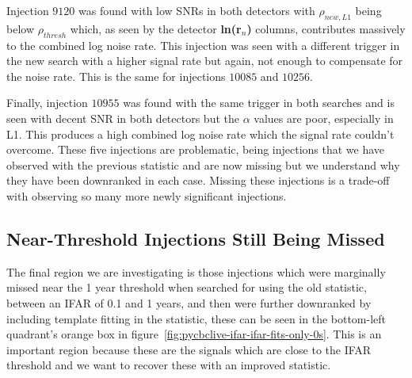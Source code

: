Injection $9120$ was found with low SNRs in both detectors with $\rho_{new, L1}$ being below $\rho_{thresh}$ which, as seen by the detector \textbf{ln(r$_n$)} columns, contributes massively to the combined log noise rate. This injection was seen with a different trigger in the new search with a higher signal rate but again, not enough to compensate for the noise rate. This is the same for injections $10085$ and $10256$.

Finally, injection $10955$ was found with the same trigger in both searches and is seen with decent SNR in both detectors but the $\alpha$ values are poor, especially in L1. This produces a high combined log noise rate which the signal rate couldn't overcome. These five injections are problematic, being injections that we have observed with the previous statistic and are now missing but we understand why they have been downranked in each case. Missing these injections is a trade-off with observing so many more newly significant injections.

\subsection{\label{sec:pycbclive-bottom-left}Near-Threshold Injections Still Being Missed}

The final region we are investigating is those injections which were marginally missed near the 1 year threshold when searched for using the old statistic, between an IFAR of 0.1 and 1 years, and then were further downranked by including template fitting in the statistic, these can be seen in the bottom-left quadrant's orange box in figure~\ref{fig:pycbclive-ifar-ifar-fits-only-0s}.  This is an important region because these are the signals which are close to the IFAR threshold and we want to recover these with an improved statistic.

